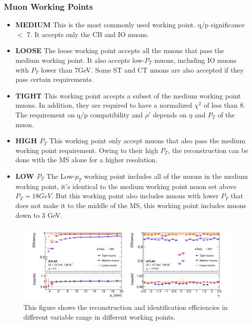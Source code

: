 \subsubsection*{Muon Working Points}
\begin{itemize}

\item \textbf{MEDIUM} \newline
This is the most commonly used working point. q/p significance $<$ 7. It accepts only the CB and IO muons.  

\item \textbf{LOOSE} \newline
    The loose working point accepts all the muons that pass the medium working point. It also accepts low-$P_{T}$ muons, including IO muons with $P_{T}$ lower than 7GeV. Some ST and CT muons are also accepted if they pass certain requirements. 

\item \textbf{TIGHT} \newline
    This working point accepts a subset of the medium working point muons. In addition, they are required to have a normalized $\chi^{2}$ of less than 8. The requirement on q/p compatibility and $\rho'$ depends on $\eta$ and $P_{T}$ of the muon.

\item \textbf{HIGH $P_{T}$} \newline
This working point only accept muons that also pass the medium working point requirement. Owing to their high $P_{T}$, the reconstruction can be done with the MS alone for a higher resolution.

\item \textbf{LOW $P_{T}$} \newline
The Low-$p_{T}$ working point includes all of the muons in the medium working point, it's identical to the medium working point muon set above $P_{T}=18GeV$. But this working point also includes muons with lower $P_{T}$ that does not make it to the middle of the MS, this working point includes muons down to 3 GeV. 

\end{itemize}

\begin{figure}[!htb]
    \begin{center}
        \includegraphics[width=1\textwidth]{figures/common_ana/IdentificationEff}
        \caption{
            This figure shows the reconstruction and identification efficiencies in different variable range in different working points\cite{Aad:2746302}.
        }
        \label{fig:isolationWP}
    \end{center}
\end{figure}




